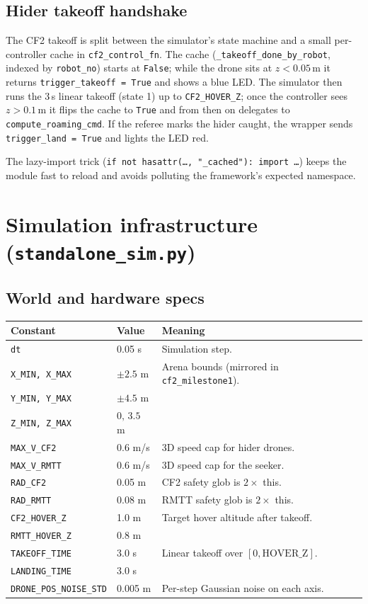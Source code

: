 \documentclass[11pt,a4paper]{article}
\newcommand{\code}[1]{\texttt{#1}}
\begin{document}
\subsection{Hider takeoff handshake}
The CF2 takeoff is split between the simulator's state machine and a small
per-controller cache in \code{cf2\_control\_fn}. The cache
(\code{\_takeoff\_done\_by\_robot}, indexed by \code{robot\_no}) starts at
\code{False}; while the drone sits at $z < 0.05$\,m it returns
\code{trigger\_takeoff = True} and shows a blue LED. The simulator then runs
the 3\,s linear takeoff (state 1) up to \code{CF2\_HOVER\_Z}; once the
controller sees $z > 0.1$\,m it flips the cache to \code{True} and from then
on delegates to \code{compute\_roaming\_cmd}. If the referee marks the hider
caught, the wrapper sends \code{trigger\_land = True} and lights the LED red.

The lazy-import trick
(\code{if not hasattr(\dots, "\_cached"): import \dots}) keeps the module
fast to reload and avoids polluting the framework's expected namespace.

\section{Simulation infrastructure (\code{standalone\_sim.py})}

\subsection{World and hardware specs}
\begin{longtable}{p{4.5cm}p{2.2cm}p{8cm}}
\toprule
\textbf{Constant} & \textbf{Value} & \textbf{Meaning} \\
\midrule
\code{dt} & 0.05 s & Simulation step. \\
\code{X\_MIN, X\_MAX} & $\pm 2.5$ m & Arena bounds (mirrored in
\code{cf2\_milestone1}). \\
\code{Y\_MIN, Y\_MAX} & $\pm 4.5$ m & \\
\code{Z\_MIN, Z\_MAX} & $0,\,3.5$ m & \\
\code{MAX\_V\_CF2} & 0.6 m/s & 3D speed cap for hider drones. \\
\code{MAX\_V\_RMTT} & 0.6 m/s & 3D speed cap for the seeker. \\
\code{RAD\_CF2} & 0.05 m & CF2 safety glob is $2 \times$ this. \\
\code{RAD\_RMTT} & 0.08 m & RMTT safety glob is $2 \times$ this. \\
\code{CF2\_HOVER\_Z} & 1.0 m & Target hover altitude after takeoff. \\
\code{RMTT\_HOVER\_Z} & 0.8 m & \\
\code{TAKEOFF\_TIME} & 3.0 s & Linear takeoff over $[0, \text{HOVER\_Z}]$. \\
\code{LANDING\_TIME} & 3.0 s & \\
\code{DRONE\_POS\_NOISE\_STD} & 0.005 m & Per-step Gaussian noise on each axis. \\
\bottomrule
\end{longtable}
\end{document}
